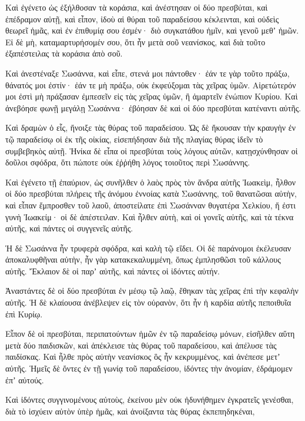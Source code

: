 {\par }{\PP {}Καὶ ἐγένετο ὡς ἐξήλθοσαν τὰ κοράσια, καὶ ἀνέστησαν οἱ δύο πρεσβύται, καὶ ἐπέδραμον αὐτῇ,
καὶ εἶπον, ἰδοὺ αἱ θύραι τοῦ παραδείσου κέκλεινται, καὶ οὐδεὶς θεωρεῖ ἡμᾶς, καὶ ἐν ἐπιθυμίᾳ σου ἐσμέν· διὸ συγκατάθου ἡμῖν, καὶ γενοῦ μεθʼ ἡμῶν.
Εἰ δὲ μὴ, καταμαρτυρήσομέν σου, ὅτι ἦν μετὰ σοῦ νεανίσκος, καὶ διὰ τοῦτο ἐξαπέστειλας τὰ κοράσια ἀπὸ σοῦ.
\par }{\PP {}Καὶ ἀνεστέναξε Σωσάννα, καὶ εἶπε, στενά μοι πάντοθεν· ἐάν τε γὰρ τοῦτο πράξω, θάνατός μοι ἐστίν· ἐάν τε μὴ πράξω, οὐκ ἐκφεύξομαι τὰς χεῖρας ὑμῶν.
Αἱρετώτερόν μοι ἐστὶ μὴ πράξασαν ἐμπεσεῖν εἰς τὰς χεῖρας ὑμῶν, ἢ ἁμαρτεῖν ἐνώπιον Κυρίου.
Καὶ ἀνεβόησε φωνῇ μεγάλῃ Σωσάννα· ἐβόησαν δὲ καὶ οἱ δύο πρεσβύται κατέναντι αὐτῆς.
\par }{\PP {}Καὶ δραμὼν ὁ εἷς, ἤνοιξε τὰς θύρας τοῦ παραδείσου.
Ὡς δὲ ἤκουσαν τὴν κραυγὴν ἐν τῷ παραδείσῳ οἱ ἐκ τῆς οἰκίας, εἰσεπήδησαν διὰ τῆς πλαγίας θύρας ἰδεῖν τὸ συμβεβηκὸς αὐτῇ.
Ἡνίκα δὲ εἶπα οἱ πρεσβύται τοὺς λόγους αὐτῶν, κατῃσχύνθησαν οἱ δοῦλοι σφόδρα, ὅτι πώποτε οὐκ ἐῤῥήθη λόγος τοιοῦτος περὶ Σωσάννης.
\par }{\PP {}Καὶ ἐγένετο τῇ ἐπαύριον, ὡς συνῆλθεν ὁ λαὸς πρὸς τὸν ἄνδρα αὐτῆς Ἰωακεὶμ, ἦλθον οἱ δύο πρεσβύται πλήρεις τῆς ἀνόμου ἐννοίας κατὰ Σωσάννης, τοῦ θανατῶσαι αὐτὴν,
καὶ εἶπαν ἔμπροσθεν τοῦ λαοῦ, ἀποστείλατε ἐπὶ Σωσάνναν θυγατέρα Χελκίου, ἥ ἐστι γυνὴ Ἰωακείμ· οἱ δὲ ἀπέστειλαν.
Καὶ ἦλθεν αὐτὴ, καὶ οἱ γονεῖς αὐτῆς, καὶ τὰ τέκνα αὐτῆς, καὶ πάντες οἱ συγγενεῖς αὐτῆς.
\par }{\PP {}Ἡ δὲ Σωσάννα ἦν τρυφερὰ σφόδρα, καὶ καλὴ τῷ εἴδει.
Οἱ δὲ παράνομοι ἐκέλευσαν ἀποκαλυφθῆναι αὐτὴν, ἦν γὰρ κατακεκαλυμμένη, ὅπως ἐμπλησθῶσι τοῦ κάλλους αὐτῆς.
Ἔκλαιον δὲ οἱ παρʼ αὐτῆς, καὶ πάντες οἱ ἰδόντες αὐτήν.
\par }{\PP {}Ἀναστάντες δὲ οἱ δύο πρεσβύται ἐν μέσῳ τῷ λαῷ, ἔθηκαν τὰς χεῖρας ἐπὶ τὴν κεφαλὴν αὐτῆς.
Ἡ δὲ κλαίουσα ἀνέβλεψεν εἰς τὸν οὐρανὸν, ὅτι ἦν ἡ καρδία αὐτῆς πεποιθυῖα ἐπὶ Κυρίῳ.
\par }{\PP {}Εἶπον δὲ οἱ πρεσβύται, περιπατούντων ἡμῶν ἐν τῷ παραδείσῳ μόνων, εἰσῆλθεν αὕτη μετὰ δύο παιδισκῶν, καὶ ἀπέκλεισε τὰς θύρας τοῦ παραδείσου, καὶ ἀπέλυσε τὰς παιδίσκας.
Καὶ ἦλθε πρὸς αὐτὴν νεανίσκος ὃς ἦν κεκρυμμένος, καὶ ἀνέπεσε μετʼ αὐτῆς.
Ἡμεῖς δὲ ὄντες ἐν τῇ γωνίᾳ τοῦ παραδείσου, ἰδόντες τὴν ἀνομίαν, ἐδράμομεν ἐπʼ αὐτούς.
\par }{\PP {}Καὶ ἰδόντες συγγινομένους αὐτοὺς, ἐκείνου μὲν οὐκ ἠδυνήθημεν ἐγκρατεῖς γενέσθαι, διὰ τὸ ἰσχύειν αὐτὸν ὑπὲρ ἡμᾶς, καὶ ἀνοίξαντα τὰς θύρας ἐκπεπηδηκέναι,
}
